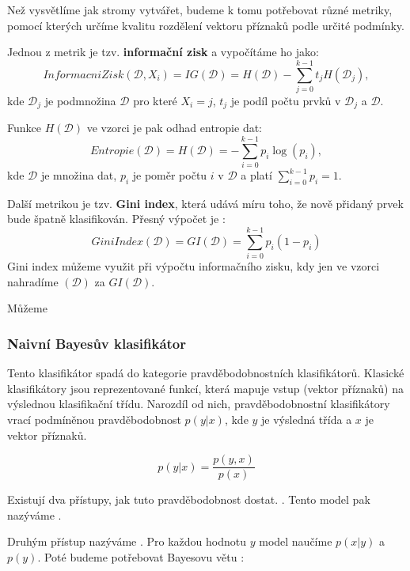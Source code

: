 Než vysvětlíme jak stromy vytvářet, budeme k tomu potřebovat různé metriky, pomocí kterých určíme kvalitu rozdělení vektoru příznaků podle určité podmínky.

Jednou z metrik je tzv. \textbf{informační zisk} a vypočítáme ho jako\cite{decisionTrees}:
\[
InformacniZisk(\mathcal{D},X_i) = IG(\mathcal{D}) = H(\mathcal{D}) - \sum^{k-1}_{j = 0} t_j  H(\mathcal{D}_j),
\]kde $\mathcal{D}_j$ je podmnožina $\mathcal{D}$ pro které $X_i = j$, $t_j$ je podíl počtu prvků v $\mathcal{D}_j$ a $\mathcal{D}$. 

Funkce $H(\mathcal{D})$ ve vzorci je pak odhad entropie dat:
\[
Entropie(\mathcal{D}) = H(\mathcal{D}) = - \sum^{k-1}_{i = 0} p_i  \log(p_i),
\]
kde $\mathcal{D}$ je množina dat, $p_i$ je  poměr počtu $i$ v $\mathcal{D}$ a platí $ \sum^{k-1}_{i = 0} p_i = 1$. 


Další metrikou je tzv. \textbf{Gini index}, která udává míru toho, že nově přidaný prvek bude špatně klasifikován. Přesný výpočet je \cite{vzd}:
\[
GiniIndex(\mathcal{D}) = GI(\mathcal{D}) = \sum^{k-1}_{i = 0} p_i  (1 - p_i) 
\]
Gini index můžeme využit při výpočtu informačního zisku, kdy jen ve vzorci nahradíme $(\mathcal{D})$ za  $GI(\mathcal{D})$.

Můžeme

\subsubsection{Naivní Bayesův klasifikátor}
Tento klasifikátor spadá do kategorie pravděbodobnostních klasifikátorů. Klasické klasifikátory jsou reprezentované funkcí, která mapuje vstup (vektor příznaků) na výslednou klasifikační třídu. Narozdíl od nich, pravděbodobnostní klasifikátory vrací podmíněnou pravděbodobnost $p(y|x)$, kde $y$ je výsledná třída  a $x$ je vektor příznaků.

\begin{definition}
    $$ p(y|x) = \frac{p(y,x)}{p(x)} $$
    \end{definition}

Existují dva přístupy, jak tuto pravděbodobnost dostat. \cite{naiveBayes}  \cite[překlad vlasntí]{naiveBayes}. Tento model pak nazýváme .

Druhým přístup nazýváme . Pro každou hodnotu $y$ model naučíme $p(x|y)$ a $p(y)$. Poté budeme potřebovat Bayesovu větu \cite{prob}:

